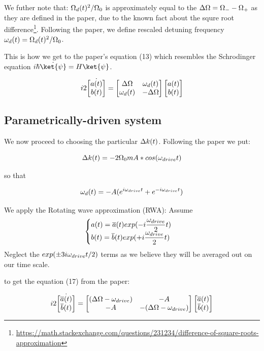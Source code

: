 We futher note that:
\ls $\Omega_d(t)^2/\Omega_0$ is approximately equal to the $\Delta\Omega = \Omega_{-} - \Omega_{+}$ as they are defined in the
paper, due to the known fact about the squre root
difference\footnote{\url{https://math.stackexchange.com/questions/231234/difference-of-square-roots-approximation}}.
\li Following the paper, we define rescaled detuning frequency $\omega_d(t) = \Omega_d(t)^2/\Omega_0$.
\le

This is how we get to the paper's equation (13) which resembles the Schrodinger equation
\(i\hbar\dot{\ket{\psi}} = H\ket{\psi}\).

\begin{equation}
i2
\dot{\begin{bmatrix}
  a(t) \\
  b(t)
\end{bmatrix}}
=
\begin{bmatrix}
  \Delta\Omega & \omega_d(t) \\
  \omega_d(t) & -\Delta\Omega
\end{bmatrix}
\begin{bmatrix}
  a(t) \\
  b(t)
\end{bmatrix}
\label{normalamp}
\end{equation}

\subsection{Parametrically-driven system}

We now proceed to choosing the particular $\Delta k(t)$. Following the paper we put:

\[
  \Delta k(t) = -2 \Omega_0 m A * cos(\omega_{drive} t)
\]

so that

\[
  \omega_d(t) = -A (e^{i \omega_{drive} t} + e^{-i \omega_{drive} t})
\]

We apply the Rotating wave approximation (RWA):
\ls Assume
    \[
      \begin{cases}
      \displaystyle a(t) = \overline{a}(t) exp(-i\frac{\omega_{drive}}{2}t) \\
      \displaystyle b(t) = \overline{b}(t) exp(+i\frac{\omega_{drive}}{2}t)
      \end{cases}
    \]
\li Neglect the $exp(\pm3i\omega_{drive} t/2)$ terms as we believe they will be averaged out on our time
    scale.
\le

to get the equation (17) from the paper:


\begin{equation}
i2
\dot{\begin{bmatrix}
  \overline{a}(t) \\
  \overline{b}(t)
\end{bmatrix}}
=
\begin{bmatrix}
  (\Delta\Omega - \omega_{drive}) & -A \\
  -A & -(\Delta\Omega - \omega_{drive})
\end{bmatrix}
\begin{bmatrix}
  \overline{a}(t) \\
  \overline{b}(t)
\end{bmatrix}
\label{rotamp}
\end{equation}


